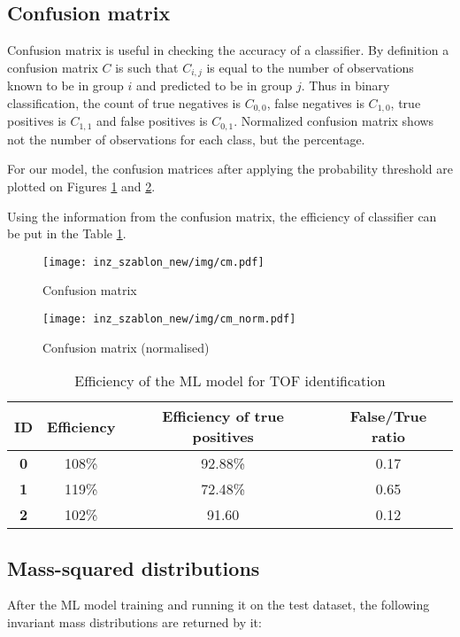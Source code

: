 \subsection{Confusion matrix}
Confusion matrix is useful in checking the accuracy of a classifier. By definition a confusion matrix $C$ is such that $C_{i, j}$ is equal to the number of observations known to be in group $i$ and predicted to be in group $j$. Thus in binary classification, the count of true negatives is $C_{0, 0}$, false negatives is $C_{1, 0}$, true positives is $C_{1, 1}$  and false positives is $C_{0, 1}$\cite{cmatrix}. Normalized confusion matrix shows not the number of observations for each class, but the percentage.

For our model, the confusion matrices after applying the probability threshold are plotted on Figures \ref{cm} and \ref{cm_norm}.

Using the information from the confusion matrix, the efficiency of classifier can be put in the Table \ref{tab:tof}.

\begin{figure}[h!]
    \centering
    \texttt{[image: inz\_szablon\_new/img/cm.pdf]}
    \caption{Confusion matrix}
    \label{cm}
\end{figure}
\begin{figure}[h!]
    \centering
    \texttt{[image: inz\_szablon\_new/img/cm\_norm.pdf]}
    \caption{Confusion matrix (normalised)}
    \label{cm_norm}
\end{figure}



\begin{table}[h!]
    \begin{tabular}{|c|c|c|c|}
    \hline
    \textbf{ID} & \textbf{Efficiency} & \textbf{Efficiency of true positives} & \textbf{False/True ratio} \\ \hline
    \textbf{0} & 108\% & 92.88\% & 0.17 \\ \hline
    \textbf{1} & 119\% & 72.48\% & 0.65 \\ \hline
    \textbf{2} & 102\% & 91.60   & 0.12 \\ \hline
    \end{tabular}
\caption{\label{tab:tof}Efficiency of the ML model for TOF identification}
\end{table}

\subsection{Mass-squared distributions}
After the ML model training and running it on the test dataset, the following invariant mass distributions are returned by it:


